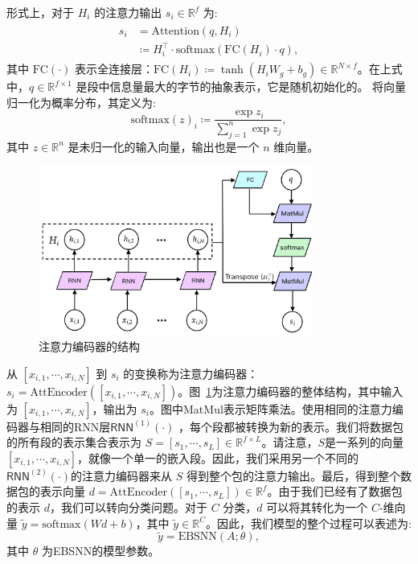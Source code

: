 \documentclass[degree=master,cjk-font=noto]{thuthesis}
\begin{document}
形式上，对于 $H_i$ 的注意力输出 $s_i \in \mathbb{R}^f$ 为:
\begin{align}
	\begin{split}
		s_i &= \text{Attention}(q, H_i) \\
		&\coloneqq H_i^\top \cdot \text{softmax}(\text{FC}(H_i) \cdot q),
	\end{split}
	\label{attention_encoder}
\end{align}
其中 $\text{FC}(\cdot)$ 表示全连接层：$\text{FC}(H_i) \coloneqq \tanh(H_i W_g + b_g) \in \mathbb{R}^{N \times f}$。在上式中，$q \in \mathbb{R}^{f \times 1}$ 是段中信息量最大的字节的抽象表示，它是随机初始化的。 将向量归一化为概率分布，其定义为:
\begin{equation}
	\text{softmax}(z)_i \coloneqq \frac{\exp{z_i}}{\sum_{j=1}^n \exp{z_j}},
\end{equation}
其中 $z \in \mathbb{R}^n$ 是未归一化的输入向量，输出也是一个 $n$ 维向量。

\begin{figure}[!tp]
	\centerline{\includegraphics[width=9.0cm]{EBSNN_attention.png}}
	\caption{注意力编码器的结构}
	\label{fig_attention}
\end{figure}


从 $[x_{i,1}, \cdots, x_{i,N}]$ 到 $s_i$ 的变换称为注意力编码器：$s_i = \text{AttEncoder}([x_{i,1}, \cdots, x_{i,N}])$。图~\ref{fig_attention}为注意力编码器的整体结构，其中输入为 $[x_{i,1}, \cdots, x_{i,N}]$，输出为 $s_i$。图中MatMul表示矩阵乘法。使用相同的注意力编码器与相同的RNN层$\textsf{RNN}^{(1)}(\cdot)$ ，每个段都被转换为新的表示。我们将数据包的所有段的表示集合表示为 $S = [s_1, \cdots, s_L] \in \mathbb{R}^{f \times L}$。请注意，$S$是一系列的向量$[x_{i,1}, \cdots, x_{i,N}]$，就像一个单一的嵌入段。因此，我们采用另一个不同的$\textsf{RNN}^{(2)}(\cdot)$的注意力编码器来从 $S$ 得到整个包的注意力输出。最后，得到整个数据包的表示向量 $d = \text{AttEncoder}([s_1, \cdots, s_L]) \in \mathbb{R}^f$。由于我们已经有了数据包的表示 $d$，我们可以转向分类问题。对于 $C$ 分类，$d$ 可以将其转化为一个 $C$-维向量 $\tilde{y}= \text{softmax}(Wd+b)$，其中 $\tilde{y} \in \mathbb{R}^C$。因此，我们模型的整个过程可以表述为:
\begin{equation}
	\tilde{y} = \text{EBSNN}(A; \theta),
\end{equation}
其中 $\theta$ 为EBSNN的模型参数。
\end{document}
